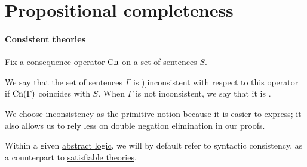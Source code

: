 \section{Propositional completeness}\label{sec:propositional_completeness}

\paragraph{Consistent theories}

\begin{definition}\label{def:consistent_set_of_sentences}
  Fix a \hyperref[def:consequence_operator]{consequence operator} \( \op{Cn} \) on a set of sentences \( S \).

  We say that the set of sentences \( \Gamma \) is \term[ru=противоречивое (множество формул) (\cite[def. 1.3.15]{Герасимов2011Вычислимость})]{inconsistent} with respect to this operator if \( \op{Cn}(\Gamma) \) coincides with \( S \). When \( \Gamma \) is not inconsistent, we say that it is .
\end{definition}
\begin{comments}
  \item We choose inconsistency as the primitive notion because it is easier to express; it also allows us to rely less on double negation elimination in our proofs.
  \item Within a given \hyperref[def:abstract_logic]{abstract logic}, we will by default refer to syntactic consistency, as a counterpart to \hyperref[def:satisfiable_set_of_sentences]{satisfiable theories}.
\end{comments}

